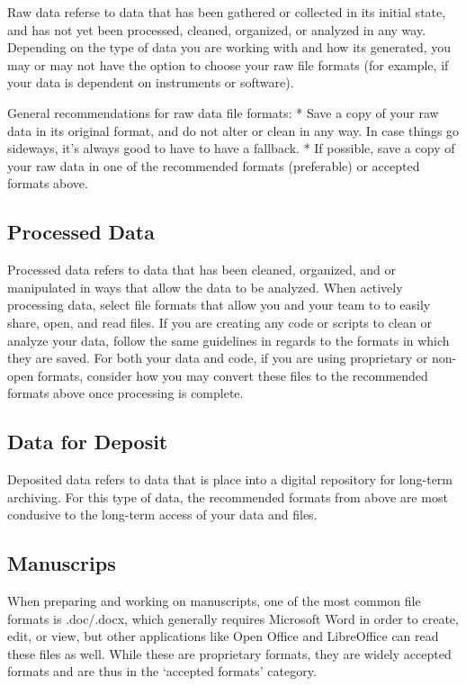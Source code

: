 \documentclass[
]{book}
\begin{document}
Raw data referse to data that has been gathered or collected in its initial state, and has not yet been processed, cleaned, organized, or analyzed in any way. Depending on the type of data you are working with and how its generated, you may or may not have the option to choose your raw file formats (for example, if your data is dependent on instruments or software).

General recommendations for raw data file formats:
* Save a copy of your raw data in its original format, and do not alter or clean in any way. In case things go sideways, it's always good to have to have a fallback.
* If possible, save a copy of your raw data in one of the recommended formats (preferable) or accepted formats above.

\hypertarget{processed-data}{%
\subsection{Processed Data}\label{processed-data}}

Processed data refers to data that has been cleaned, organized, and or manipulated in ways that allow the data to be analyzed. When actively processing data, select file formats that allow you and your team to to easily share, open, and read files. If you are creating any code or scripts to clean or analyze your data, follow the same guidelines in regards to the formats in which they are saved. For both your data and code, if you are using proprietary or non-open formats, consider how you may convert these files to the recommended formats above once processing is complete.

\hypertarget{data-for-deposit}{%
\subsection{Data for Deposit}\label{data-for-deposit}}

Deposited data refers to data that is place into a digital repository for long-term archiving. For this type of data, the recommended formats from above are most condusive to the long-term access of your data and files.

\hypertarget{manuscrips}{%
\subsection*{Manuscrips}\label{manuscrips}}

When preparing and working on manuscripts, one of the most common file formats is .doc/.docx, which generally requires Microsoft Word in order to create, edit, or view, but other applications like Open Office and LibreOffice can read these files as well. While these are proprietary formats, they are widely accepted formats and are thus in the `accepted formats' category.
\end{document}
